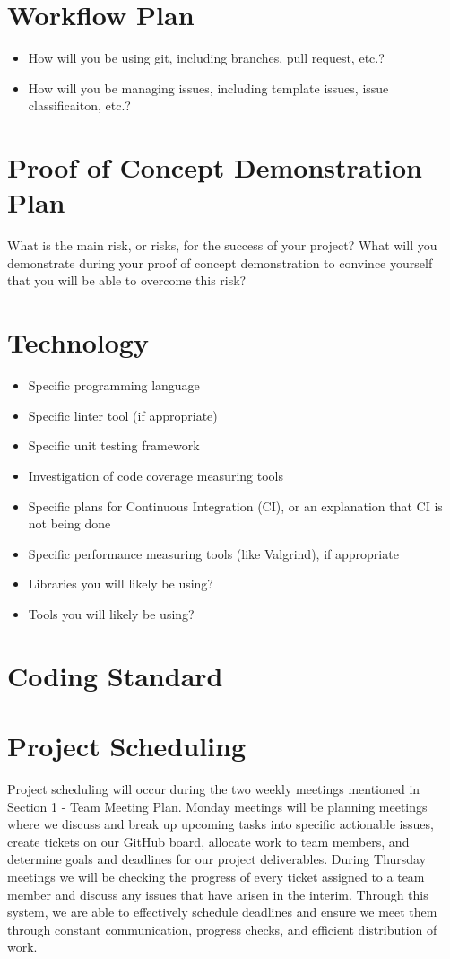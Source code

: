\documentclass{article}
\begin{document}
\section{Workflow Plan}

\begin{itemize}
	\item How will you be using git, including branches, pull request, etc.?
	\item How will you be managing issues, including template issues, issue
	classificaiton, etc.?
\end{itemize}

\section{Proof of Concept Demonstration Plan}

What is the main risk, or risks, for the success of your project?  What will you
demonstrate during your proof of concept demonstration to convince yourself that
you will be able to overcome this risk?

\section{Technology}

\begin{itemize}
\item Specific programming language
\item Specific linter tool (if appropriate)
\item Specific unit testing framework
\item Investigation of code coverage measuring tools
\item Specific plans for Continuous Integration (CI), or an explanation that CI
  is not being done
\item Specific performance measuring tools (like Valgrind), if
  appropriate
\item Libraries you will likely be using?
\item Tools you will likely be using?
\end{itemize}

\section{Coding Standard}

\section{Project Scheduling}

Project scheduling will occur during the two weekly meetings mentioned in Section 1 - Team Meeting Plan. Monday meetings will be planning meetings where we discuss and break up upcoming tasks into specific actionable issues, create tickets on our GitHub board, allocate work to team members, and determine goals and deadlines for our project deliverables. During Thursday meetings we will be checking the progress of every ticket assigned to a team member and discuss any issues that have arisen in the interim. Through this system, we are able to effectively schedule deadlines and ensure we meet them through constant communication, progress checks, and efficient distribution of work.
\end{document}
